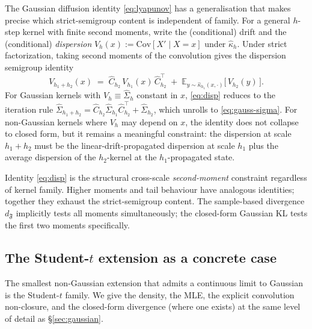 \documentclass[11pt]{article}
\newcommand{\E}{\mathbb{E}}
\theoremstyle{definition}
\theoremstyle{plain}
\begin{document}
The Gaussian diffusion identity \eqref{eq:lyapunov} has a
generalisation that makes precise which strict-semigroup content
is independent of family. For a general $h$-step kernel with finite
second moments, write the (conditional) drift and the (conditional)
\emph{dispersion} $V_h(x) := \mathrm{Cov}[X' \mid X = x]$ under
$\hat\kappa_h$. Under strict factorization, taking second moments
of the convolution gives the dispersion semigroup identity
\begin{equation}
  \label{eq:disp}
  V_{h_1 + h_2}(x) \;=\; \hat C_{h_2}\, V_{h_1}(x)\, \hat C_{h_2}^{\top}
    \;+\; \E_{y \sim \hat\kappa_{h_1}(x, \cdot)}\!\bigl[\, V_{h_2}(y)\,\bigr].
\end{equation}
For Gaussian kernels with $V_h \equiv \hat\Sigma_h$ constant in
$x$, \eqref{eq:disp} reduces to the iteration rule
$\hat\Sigma_{h_1 + h_2} = \hat C_{h_2} \hat\Sigma_{h_1}
\hat C_{h_2}^{\top} + \hat\Sigma_{h_2}$, which unrolls to
\eqref{eq:gauss-sigma}. For non-Gaussian kernels where $V_h$ may
depend on $x$, the identity does not collapse to closed form, but
it remains a meaningful constraint: the dispersion at scale
$h_1+h_2$ must be the linear-drift-propagated dispersion at scale
$h_1$ plus the average dispersion of the $h_2$-kernel at the
$h_1$-propagated state.

Identity \eqref{eq:disp} is the structural cross-scale
\emph{second-moment} constraint regardless of kernel family.
Higher moments and tail behaviour have analogous identities;
together they exhaust the strict-semigroup content. The
sample-based divergence $d_{\mathfrak{F}}$ implicitly tests all
moments simultaneously; the closed-form Gaussian KL tests the
first two moments specifically.

\subsection{The Student-$t$ extension as a concrete case}
\label{sec:student-t}

The smallest non-Gaussian extension that admits a continuous limit
to Gaussian is the Student-$t$ family. We give the density, the
MLE, the explicit convolution non-closure, and the closed-form
divergence (where one exists) at the same level of detail as
\S\ref{sec:gaussian}.
\end{document}
